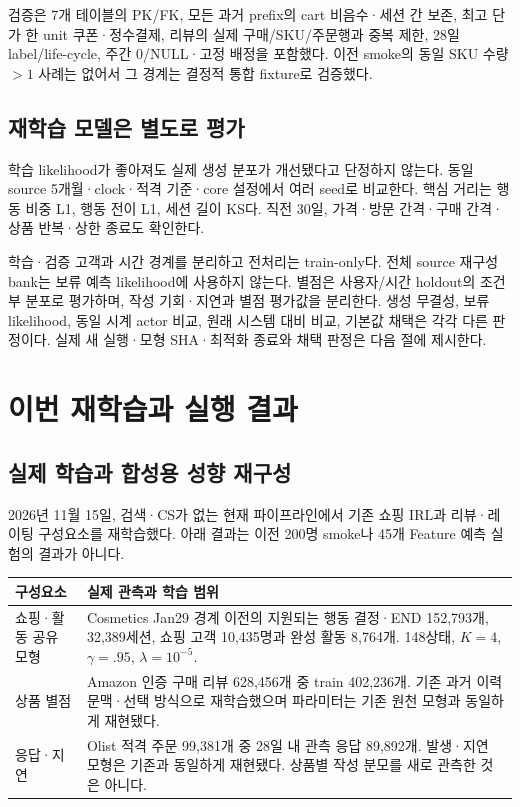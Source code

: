 \documentclass[11pt,a4paper]{article}
\newcommand{\page}{\clearpage}
\newcommand{\thead}{\rowcolor{pale}}
\begin{document}
검증은 7개 테이블의 PK/FK, 모든 과거 prefix의 cart 비음수·세션 간 보존, 최고 단가 한 unit 쿠폰·정수결제, 리뷰의 실제 구매/SKU/주문행과 중복 제한, 28일 label/life-cycle, 주간 0/NULL·고정 배정을 포함했다. 이전 smoke의 동일 SKU 수량 $>1$ 사례는 없어서 그 경계는 결정적 통합 fixture로 검증했다.

\subsection{재학습 모델은 별도로 평가}
학습 likelihood가 좋아져도 실제 생성 분포가 개선됐다고 단정하지 않는다. 동일 source 5개월·clock·적격 기준·core 설정에서 여러 seed로 비교한다. 핵심 거리는 행동 비중 L1, 행동 전이 L1, 세션 길이 KS다. 직전 30일, 가격·방문 간격·구매 간격·상품 반복·상한 종료도 확인한다.

학습·검증 고객과 시간 경계를 분리하고 전처리는 train-only다. 전체 source 재구성 bank는 보류 예측 likelihood에 사용하지 않는다. 별점은 사용자/시간 holdout의 조건부 분포로 평가하며, 작성 기회·지연과 별점 평가값을 분리한다. 생성 무결성, 보류 likelihood, 동일 시계 actor 비교, 원래 시스템 대비 비교, 기본값 채택은 각각 다른 판정이다. 실제 새 실행·모형 SHA·최적화 종료와 채택 판정은 다음 절에 제시한다.

\page
\section{이번 재학습과 실행 결과}
\subsection{실제 학습과 합성용 성향 재구성}
2026년 11월 15일, 검색·CS가 없는 현재 파이프라인에서 기존 쇼핑 IRL과 리뷰·레이팅 구성요소를 재학습했다. 아래 결과는 이전 200명 smoke나 45개 Feature 예측 실험의 결과가 아니다.

\begin{tabularx}{\linewidth}{@{}P{.22\linewidth}Y@{}}
\thead 구성요소 & 실제 관측과 학습 범위\\\midrule
쇼핑·활동 공유 모형 & Cosmetics Jan29 경계 이전의 지원되는 행동 결정·END 152,793개, 32,389세션, 쇼핑 고객 10,435명과 완성 활동 8,764개. 148상태, $K=4$, $\gamma=.95$, $\lambda=10^{-5}$.\\
상품 별점 & Amazon 인증 구매 리뷰 628,456개 중 train 402,236개. 기존 과거 이력 문맥·선택 방식으로 재학습했으며 파라미터는 기존 원천 모형과 동일하게 재현됐다.\\
응답·지연 & Olist 적격 주문 99,381개 중 28일 내 관측 응답 89,892개. 발생·지연 모형은 기존과 동일하게 재현됐다. 상품별 작성 분모를 새로 관측한 것은 아니다.\\\bottomrule
\end{tabularx}
\end{document}
